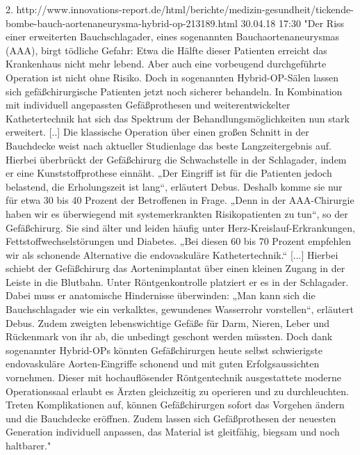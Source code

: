 2. http://www.innovations-report.de/html/berichte/medizin-gesundheit/tickende-bombe-bauch-aortenaneurysma-hybrid-op-213189.html 30.04.18 17:30
	"Der Riss einer erweiterten Bauchschlagader, eines sogenannten Bauchaortenaneurysmas (AAA), birgt tödliche Gefahr: Etwa die Hälfte dieser Patienten erreicht das Krankenhaus nicht mehr lebend.
	Aber auch eine vorbeugend durchgeführte Operation ist nicht ohne Risiko. Doch in sogenannten Hybrid-OP-Sälen lassen sich gefäßchirurgische Patienten jetzt noch sicherer behandeln. In Kombination mit individuell angepassten Gefäßprothesen und weiterentwickelter Kathetertechnik hat sich das Spektrum der Behandlungsmöglichkeiten nun stark erweitert. [..]
	Die klassische Operation über einen großen Schnitt in der Bauchdecke weist nach aktueller Studienlage das beste Langzeitergebnis auf. Hierbei überbrückt der Gefäßchirurg die Schwachstelle in der Schlagader, indem er eine Kunststoffprothese einnäht.
	„Der Eingriff ist für die Patienten jedoch belastend, die Erholungszeit ist lang“, erläutert Debus. Deshalb komme sie nur für etwa 30 bis 40 Prozent der Betroffenen in Frage. „Denn in der AAA-Chirurgie haben wir es überwiegend mit systemerkrankten Risikopatienten zu tun“, so der Gefäßchirurg. Sie sind älter und leiden häufig unter Herz-Kreislauf-Erkrankungen, Fettstoffwechselstörungen und Diabetes. „Bei diesen 60 bis 70 Prozent empfehlen wir als schonende Alternative die endovaskuläre Kathetertechnik.“
	[...]
	Hierbei schiebt der Gefäßchirurg das Aortenimplantat über einen kleinen Zugang in der Leiste in die Blutbahn. Unter Röntgenkontrolle platziert er es in der Schlagader. Dabei muss er anatomische Hindernisse überwinden: „Man kann sich die Bauchschlagader wie ein verkalktes, gewundenes Wasserrohr vorstellen“, erläutert Debus. Zudem zweigten lebenswichtige Gefäße für Darm, Nieren, Leber und Rückenmark von ihr ab, die unbedingt geschont werden müssten. Doch dank sogenannter Hybrid-OPs könnten Gefäßchirurgen heute selbst schwierigste endovaskuläre Aorten-Eingriffe schonend und mit guten Erfolgsaussichten vornehmen.
	Dieser mit hochauflösender Röntgentechnik ausgestattete moderne Operationssaal erlaubt es Ärzten gleichzeitig zu operieren und zu durchleuchten. Treten Komplikationen auf, können Gefäßchirurgen sofort das Vorgehen ändern und die Bauchdecke eröffnen. Zudem lassen sich Gefäßprothesen der neuesten Generation individuell anpassen, das Material ist gleitfähig, biegsam und noch haltbarer."
	




